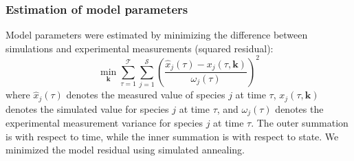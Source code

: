 \documentclass[10pt,twocolumn,twoside,final]{IEEEtran}
\begin{document}
\subsubsection*{Estimation of model parameters}
Model parameters were estimated by minimizing the difference between simulations and experimental measurements (squared residual):
\begin{equation}\label{eqn:objective-function}
	\min_{\mathbf{k}} \sum_{\tau=1}^{\mathcal{T}}\sum_{j=1}^{\mathcal{S}}\left(\frac{\hat{x}_{j}\left(\tau\right) - x_{j}\left(\tau,\mathbf{k}\right)}{\omega_{j}\left(\tau\right)}\right)^{2}
\end{equation}where $\hat{x}_{j}\left(\tau\right)$ denotes the measured value of species $j$ at time $\tau$, $x_{j}\left(\tau,\mathbf{k}\right)$ denotes the simulated
value for species $j$ at time $\tau$, and $\omega_{j}\left(\tau\right)$ denotes the experimental measurement variance for species $j$ at time $\tau$.
The outer summation is with respect to time, while the inner summation is with respect to state. We minimized the model residual using simulated annealing.


\end{document}

